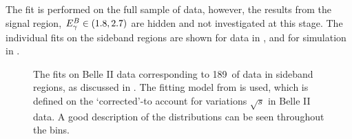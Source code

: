 The fit is performed on the full sample of data, however, the results from the signal region, ${E^B_{\gamma}}\in(1.8,2.7)$ are hidden and not investigated at this stage.
The individual \Mbc fits on the \EB sideband regions are shown for data in , and for simulation in .
\begin{figure}[htbp!]
    \centering
    \caption{\label{fig:sideband_data_fit}    
    The \Mbc fits on Belle II data corresponding to 189~\invfb of data in \EB sideband regions,
    as discussed in .
    The fitting model from  is used,
    which is defined on the `corrected'-\Mbc to account for variations $\sqrt{s}$ in Belle II data.
    A good description of the \Mbc distributions can be seen throughout the \EB bins.
    }
\end{figure}
